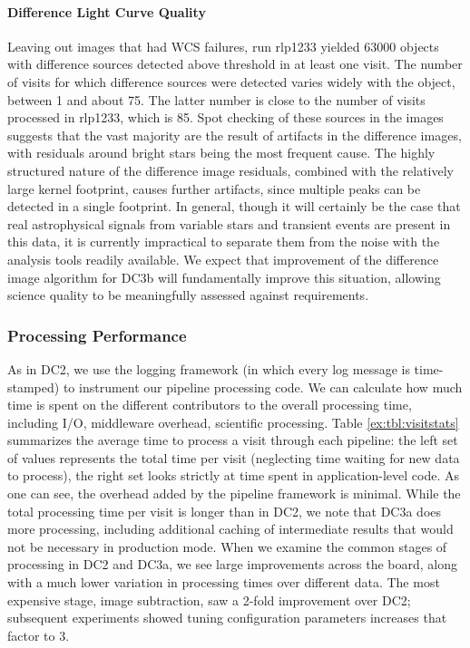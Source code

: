 \paragraph{Difference Light Curve Quality}
Leaving out images that had WCS failures, run rlp1233 yielded 63000
objects with difference sources detected above threshold in at least
one visit. The number of visits
for which difference sources were detected varies widely with the object, between 1 and
about 75.  The latter number is close to the number of visits
processed in rlp1233, which is 85.  Spot checking of these sources in
the images suggests that the vast majority are the result of artifacts
in the difference images, with residuals around bright stars being the
most frequent cause.  The highly structured nature of the difference
image residuals, combined with the relatively large kernel footprint,
causes further artifacts, since multiple peaks can be detected in a
single footprint.  In general, though it will certainly be the case
that real astrophysical signals from variable stars and transient
events are present in this data, it is currently impractical to
separate them from the noise with the analysis tools readily
available.  We expect that improvement of the difference image
algorithm for DC3b will fundamentally improve this situation, allowing
science quality to be meaningfully assessed against requirements.

\subsubsection{Processing Performance}

As in DC2, we use the logging framework (in which every log message is
time-stamped) to instrument our pipeline processing code.  We can
calculate how much time is spent on the different contributors to the
overall processing time, including I/O, middleware overhead,
scientific processing.  Table \ref{ex:tbl:visitstats} summarizes the
average time to process a visit through each pipeline: the left set of
values represents the total time per visit (neglecting time waiting
for new data to process), the right set looks strictly at time spent
in application-level code.  As one can see, the overhead added by the
pipeline framework is minimal.  While the total processing time per
visit is longer than in DC2, we note that DC3a does more processing,
including additional caching of intermediate results that would not be
necessary in production mode.  When we examine the common stages of
processing in DC2 and DC3a, we see large improvements across the
board, along with a much lower variation in processing times over
different data.  The most expensive stage, image subtraction, saw a
2-fold improvement over DC2; subsequent experiments showed tuning
configuration parameters increases that factor to 3.

